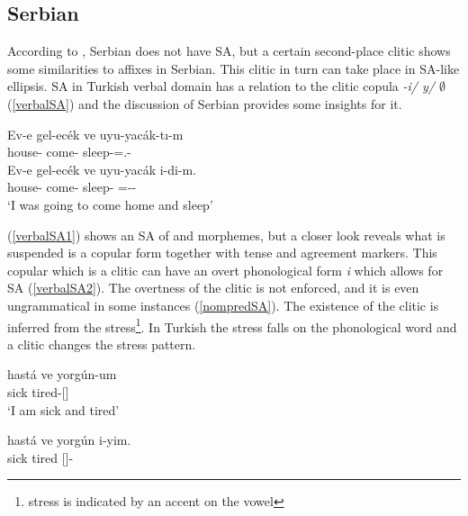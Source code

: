 \subsection{Serbian}

According to \cite{despic2017suspended}, Serbian does not have SA, but a certain second-place clitic shows some similarities to affixes in Serbian. This clitic in turn can take place in SA-like ellipsis. SA in Turkish verbal domain has a relation to the clitic copula \textit{-i/ y/ $\emptyset$} (\ref{verbalSA}) and the discussion of Serbian provides some insights for it.

\begin{exe}
    \ex \label{verbalSA}
    \begin{xlist}
        \ex \label{verbalSA1}
        \gll Ev-e gel-ec\'{e}k ve uyu-yac\'{a}k-tı-m \\ 
        house-{\Dat} come-{\Fut} {\And} sleep-{\Fut}={\Cop}.{\Pst}-{\Fsg} \\
        
        \ex \label{verbalSA2}
        \gll Ev-e gel-ec\'{e}k ve uyu-yac\'{a}k i-di-m. \\ 
        house-{\Dat} come-{\Fut} {\And} sleep-{\Fut} ={\Cop}-{\Pst}-{\Fsg} \\
        \glt `I was going to come home and sleep'
    \end{xlist}
\end{exe}

(\ref{verbalSA1}) shows an SA of {\Pst} and {\Agr} morphemes, but a closer look reveals what is suspended is a copular form together with tense and agreement markers. This copular which is a clitic can have an overt phonological form \textit{i} which allows for SA (\ref{verbalSA2}). The overtness of the clitic is not enforced, and it is even ungrammatical in some instances (\ref{nompredSA}). The existence of the clitic is inferred from the stress\footnote{stress is indicated by an accent on the vowel}. In Turkish the stress falls on the phonological word and a clitic changes the stress pattern.

\begin{exe}
    \ex \label{nompredSA}
    \begin{xlist}
        \ex \gll hast\'{a} ve yorg\'{u}n-um \\
        sick {\And} tired-{\Fsg}[{\Prs}] \\
        \glt `I am sick and tired'
        
        \ex \gll *hast\'{a} ve yorg\'{u}n i-yim. \\ 
        sick {\And} tired {\Cop}[{\Prs}]-{\Fsg} \\
    \end{xlist}
\end{exe}

